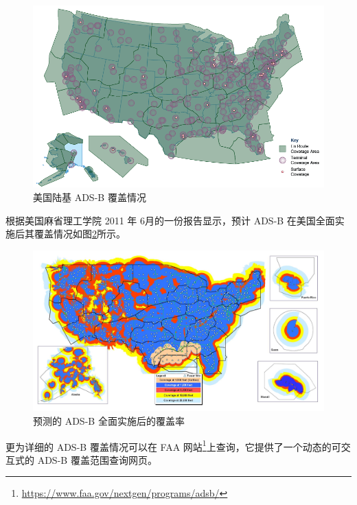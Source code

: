 \begin{figure}[!htb]
\centering
\includegraphics[width=14cm]{pic/ADS-B-Coverage-Area.png}
\caption{美国陆基 ADS-B 覆盖情况\protect\footnotemark}
\label{fig:ADS-B-Coverage-Area}
\end{figure}


根据美国麻省理工学院 2011 年 6月的一份报告显示，预计 ADS-B 在美国全面实施后其覆盖情况如图\ref{fig:ADSB-final}所示。

\begin{figure}[!htb]
\centering
\includegraphics[width=14cm]{pic/ADSB-final.png}
\caption{预测的 ADS-B 全面实施后的覆盖率\protect\footnotemark}
\label{fig:ADSB-final}
\end{figure}


更为详细的 ADS-B 覆盖情况可以在 FAA 网站\footnote{\url{https://www.faa.gov/nextgen/programs/adsb/}}上查询，它提供了一个动态的可交互式的 ADS-B 覆盖范围查询网页。

